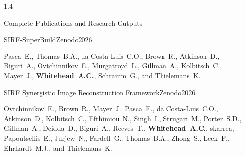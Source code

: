 \documentclass{cv}
\begin{document}
    \begin{spacing}{1.4}
        \normalsize
        
        \begin{rSection}{Complete Publications and Research Outputs}
            \vspace{-0.5cm}
            \item \begin{rSubsection}{\href{https://doi.org/10.5281/zenodo.22752875}{SIRF-SuperBuild}}{}{Zenodo}{2026}
                \vspace{-0.25cm}
                \item Pasca~E., Thomas~B.A., da Costa-Luis~C.O., Brown~R., Atkinson~D., Biguri~A., Ovtchinnikov~E., Murgatroyd~L., Gillman~A., Kolbitsch~C., Mayer~J., \textbf{Whitehead~A.C.}, Schramm~G., and Thielemans~K.
                \\
            \end{rSubsection}

            \vspace{-0.5cm}
            \item \begin{rSubsection}{\href{https://doi.org/10.5281/zenodo.20744560}{SIRF Synergistic Image Reconstruction Framework}}{}{Zenodo}{2026}
                \vspace{-0.25cm}
                \item Ovtchinnikov~E., Brown~R., Mayer~J., Pasca~E., da Costa-Luis~C.O., Atkinson~D., Kolbitsch~C., Efthimiou~N., Singh~I., Strugari~M., Porter~S.D., Gillman~A., Deidda~D., Biguri~A., Reeves~T., \textbf{Whitehead~A.C.}, skarrea, Papoutsellis~E., Jurjew~N., Fardell~G., Thomas~B.A., Zhong~S., Leek~F., Ehrhardt~M.J., and Thielemans~K.
                \\
            \end{rSubsection}


\end{rSection}
\end{spacing}
\end{document}
